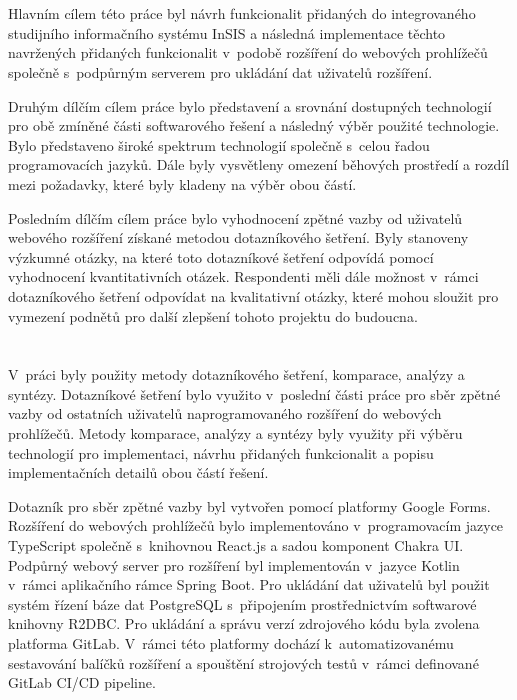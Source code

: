 \section*{\CilPrace}

Hlavním cílem této práce byl návrh funkcionalit přidaných do integrovaného studijního informačního systému InSIS a následná implementace těchto navržených přidaných funkcionalit v~podobě rozšíření do webových prohlížečů společně s~podpůrným serverem pro ukládání dat uživatelů rozšíření. 

Druhým dílčím cílem práce bylo představení a srovnání dostupných technologií pro obě zmíněné části softwarového řešení a následný výběr použité technologie. Bylo představeno široké spektrum technologií společně s~celou řadou programovacích jazyků. Dále byly vysvětleny omezení běhových prostředí a rozdíl mezi požadavky, které byly kladeny na výběr obou částí.  

Posledním dílčím cílem práce bylo vyhodnocení zpětné vazby od uživatelů webového rozšíření získané metodou dotazníkového šetření. Byly stanoveny výzkumné otázky, na které toto dotazníkové šetření odpovídá pomocí vyhodnocení kvantitativních otázek. Respondenti měli dále možnost v~rámci dotazníkového šetření odpovídat na kvalitativní otázky, které mohou sloužit pro vymezení podnětů pro další zlepšení tohoto projektu do budoucna. 

\section*{\PouziteMetody}

V~práci byly použity metody dotazníkového šetření, komparace, analýzy a syntézy. Dotazníkové šetření bylo využito v~poslední části práce pro sběr zpětné vazby od ostatních uživatelů naprogramovaného rozšíření do webových prohlížečů. Metody komparace, analýzy a syntézy byly využity při výběru technologií pro implementaci, návrhu přidaných funkcionalit a popisu implementačních detailů obou částí řešení.    

Dotazník pro sběr zpětné vazby byl vytvořen pomocí platformy Google Forms. Rozšíření do webových prohlížečů bylo implementováno v~programovacím jazyce TypeScript společně s~knihovnou React.js a sadou komponent Chakra UI. Podpůrný webový server pro rozšíření byl implementován v~jazyce Kotlin v~rámci aplikačního rámce Spring Boot. Pro ukládání dat uživatelů byl použit systém řízení báze dat PostgreSQL s~připojením prostřednictvím softwarové knihovny R2DBC. Pro ukládání a správu verzí zdrojového kódu byla zvolena platforma GitLab. V~rámci této platformy dochází k~automatizovanému sestavování balíčků rozšíření a spouštění strojových testů v~rámci definované GitLab CI/CD pipeline.

